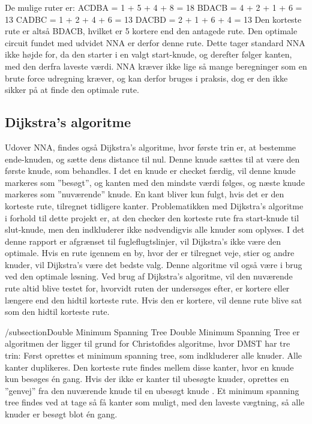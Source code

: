 De mulige ruter er: \newline
ACDBA = 1 + 5 + 4 + 8 = 18\newline
BDACB = 4 + 2 + 1 + 6 = 13\newline
CADBC = 1 + 2 + 4 + 6 = 13\newline
DACBD = 2 + 1 + 6 + 4 = 13\newline
Den korteste rute er altså BDACB, hvilket er 5 kortere end den antagede rute. Den optimale circuit fundet med udvidet NNA er derfor denne rute. Dette tager standard NNA ikke højde for, da den starter i en valgt start-knude, og derefter følger kanten, med den derfra laveste værdi. NNA kræver ikke lige så mange beregninger som en brute force udregning kræver, og kan derfor bruges i praksis, dog er den ikke sikker på at finde den optimale rute.


\subsection{Dijkstra's algoritme}
Udover NNA, findes også Dijkstra’s algoritme, hvor første trin er, at bestemme ende-knuden, og sætte dens distance til nul. Denne knude sættes til at være den første knude, som behandles. I det en knude er checket færdig, vil denne knude markeres som ”besøgt”, og kanten med den mindste værdi følges, og næste knude markeres som ”nuværende” knude. En kant bliver kun fulgt, hvis det er den korteste rute, tilregnet tidligere kanter.
Problematikken med Dijkstra’s algoritme i forhold til dette projekt er, at den checker den korteste rute fra start-knude til slut-knude, men den indkluderer ikke nødvendigvis alle knuder som oplyses. I det denne rapport er afgrænset til fugleflugtslinjer, vil Dijkstra’s ikke være den optimale. Hvis en rute igennem en by, hvor der er tilregnet veje, stier og andre knuder, vil Dijkstra’s være det bedste valg. Denne algoritme vil også være i brug ved den optimale løsning. Ved brug af Dijkstra’s algoritme, vil den nuværende rute altid blive testet for, hvorvidt ruten der undersøges efter, er kortere eller længere end den hidtil korteste rute. Hvis den er kortere, vil denne rute blive sat som den hidtil korteste rute. \citep{Dijkstra}

/subsection{Double Minimum Spanning Tree}
Double Minimum Spanning Tree er algoritmen der ligger til grund for Christofides algoritme, hvor DMST har tre trin: \newline
Først oprettes et minimum spanning tree, som indkluderer alle knuder. \newline
Alle kanter duplikeres. \newline
Den korteste rute findes mellem disse kanter, hvor en knude kun besøges én gang. \newline
Hvis der ikke er kanter til ubesøgte knuder, oprettes en ”genvej” fra den nuværende knude til en ubesøgt knude \citep{DMST}. \newline
Et minimum spanning tree findes ved at tage så få kanter som muligt, med den laveste vægtning, så alle knuder er besøgt blot én gang.

